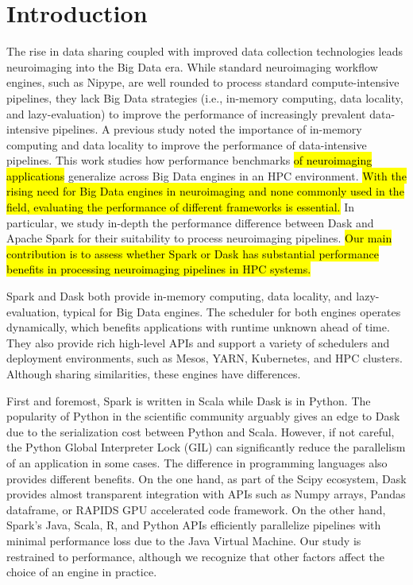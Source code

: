 \documentclass[AMA,STIX1COL]{WileyNJD-v2}
\newcommand{\HL}[1]{\hl{#1}}
\begin{document}
\section{Introduction}
The rise in data sharing coupled with improved data collection technologies leads neuroimaging into the Big Data era\cite{ALFAROALMAGRO2018400, van2014human, ConpPortal}.
While standard neuroimaging workflow engines, such as Nipype\cite{Nipype:11}, are well rounded to process standard compute-intensive pipelines,
they lack Big Data strategies (i.e., in-memory computing, data locality, and lazy-evaluation) to improve the performance of increasingly prevalent data-intensive pipelines.
A previous study\cite{8752675} noted the importance of in-memory computing and data locality to improve the performance of data-intensive pipelines.
This work studies how performance benchmarks \HL{of neuroimaging applications} generalize across Big Data engines in an HPC environment.
\HL{
	With the rising need for Big Data engines in neuroimaging and none commonly
	used in the field, evaluating the performance of different frameworks is essential.
}
In particular, we study in-depth the performance difference between Dask\cite{Dask:15} and Apache Spark\cite{Spark:16} for their suitability to process neuroimaging pipelines.
\HL{
	Our main contribution is to assess whether Spark or Dask has substantial performance benefits in processing neuroimaging pipelines in HPC systems.
}
	
Spark and Dask both provide in-memory computing, data locality, and lazy-evaluation, typical for Big Data engines.
The scheduler for both engines operates dynamically, which benefits applications with runtime unknown ahead of time\cite{Dask:15}.
They also provide rich high-level APIs and support a variety of schedulers and deployment environments, such as Mesos\cite{hindman2011mesos}, YARN\cite{vavilapalli2013apache}, Kubernetes, and HPC clusters.
Although sharing similarities, these engines have differences.
	
First and foremost, Spark is written in Scala while Dask is in Python.
The popularity of Python in the scientific community arguably gives an edge to Dask due to the serialization cost between Python and Scala.
However, if not careful, the Python Global Interpreter Lock (GIL) can significantly reduce the parallelism of an application in some cases.
The difference in programming languages also provides different benefits.
On the one hand, as part of the Scipy ecosystem, Dask provides almost transparent integration with APIs such as Numpy arrays, Pandas dataframe, or RAPIDS GPU accelerated code framework.
On the other hand, Spark's Java, Scala, R, and Python APIs efficiently parallelize pipelines with minimal performance loss due to the Java Virtual Machine.
Our study is restrained to performance, although we recognize that other factors affect the choice of an engine in practice.
	
\end{document}
